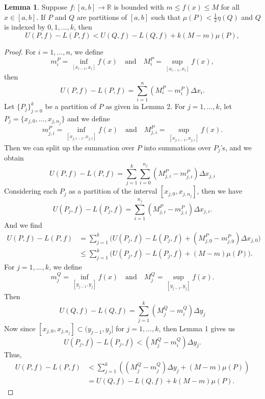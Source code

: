\documentclass[12pt]{article}
\theoremstyle{definition}
\newtheorem{lemma}{Lemma}
\newcommand{\isp}[1]{\quad\text{#1}\quad}
\newcommand{\R}{\mathbb{R}}
\begin{document}
\newpage
\begin{lemma}
    Suppose $f : [a, b] \to \R$ is bounded with $m \leq f(x) \leq M$ for all $x \in [a, b]$. If $P$ and $Q$ are partitions of $[a, b]$ such that $\mu(P) < \tfrac12\eta(Q)$ and $Q$ is indexed by $0, 1, \dots, k$, then
    \[
        U(P, f) - L(P, f) < U(Q, f) - L(Q, f) + k(M - m)\mu(P),
    \]
\end{lemma}

\begin{proof}
    For $i = 1, \dots, n$, we define
    \[
        m^P_i = \inf_{[x_{i-1}, x_i]} f(x) \isp{and} M^P_i = \sup_{[x_{i-1}, x_i]} f(x),
    \]
    then
    \[
        U(P, f) - L(P, f) = \sum_{i=1}^n \left(M^P_i - m^P_i\right) \Delta x_i.
    \]
    Let $\{P_j\}_{j=0}^k$ be a partition of $P$ as given in Lemma 2. For $j = 1, \dots, k$, let $P_j = \{x_{j,0}, \dots, x_{j, n_j}\}$ and we define
    \[
        m^P_{j,i} = \inf_{[x_{j,i-1}, x_{j,i}]} f(x) \isp{and} M^P_{j,i} = \sup_{[x_{j,i-1}, x_{j,i}]} f(x).
    \]
    Then we can split up the summation over $P$ into summations over $P_j$'s, and we obtain
    \[
        U(P, f) - L(P, f) = \sum_{j=1}^k \sum_{i=0}^{n_j} \left(M^P_{j,i} - m^P_{j,i}\right) \Delta x_{j,i}
    \]
    Considering each $P_j$ as a partition of the interval $[x_{j,0}, x_{j,n_j}]$, then we have
    \[
        U(P_j, f) - L(P_j, f) = \sum_{i=1}^{n_j} \left(M^P_{j,i} - m^P_{j,i}\right) \Delta x_{j,i}.
    \]
    And we find
    \begin{align*}
        U(P, f) - L(P, f) 
            &= \sum_{j=1}^k \Big(U(P_j, f) - L(P_j, f) + \left(M^P_{j,0} - m^P_{j,0}\right)\Delta x_{j,0}\Big) \\
            &\leq \sum_{j=1}^k \Big(U(P_j, f) - L(P_j, f) + (M - m)\mu(P)\Big).
    \end{align*}
    For $j = 1, \dots, k$, we define
    \[
        m^Q_j = \inf_{[y_{j-1}, y_j]} f(x) \isp{and} M^Q_j = \sup_{[y_{j-1}, y_j]} f(x).
    \]
    Then
    \[
        U(Q, f) - L(Q, f) = \sum_{j=1}^k \left(M^Q_j - m^Q_i\right) \Delta y_j
    \]
    Now since $[x_{j,0}, x_{j,n_j}] \subset (y_{j-1}, y_j]$ for $j = 1, \dots, k$, then Lemma 1 gives us
    \[
        U(P_j, f) - L(P_j, f) < \left(M^Q_j - m^Q_i\right) \Delta y_j.
    \]
    Thus,
    \begin{align*}
        U(P, f) - L(P, f)
            &< \sum_{j=1}^k \left(\left(M^Q_j - m^Q_j\right)\Delta y_j + (M - m)\mu(P)\right)\\
            &= U(Q, f) - L(Q, f) + k(M - m)\mu(P).
    \end{align*}
    
\end{proof}
\end{document}
